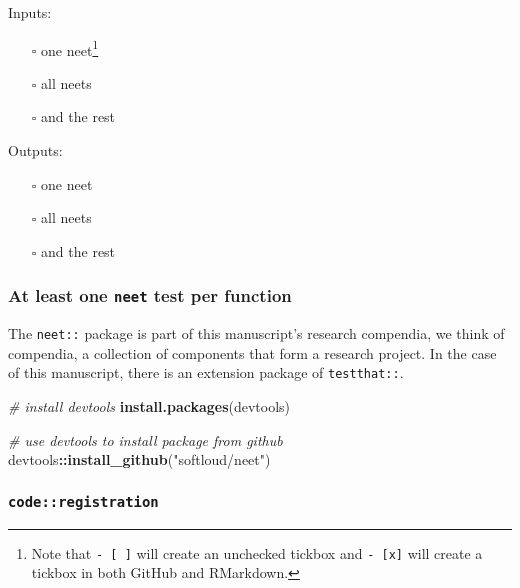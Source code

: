\documentclass[
]{article}
\newenvironment{Shaded}{\begin{snugshade}}{\end{snugshade}}
\newcommand{\CommentTok}[1]{\textcolor[rgb]{0.56,0.35,0.01}{\textit{#1}}}
\newcommand{\KeywordTok}[1]{\textcolor[rgb]{0.13,0.29,0.53}{\textbf{#1}}}
\newcommand{\NormalTok}[1]{#1}
\newcommand{\OperatorTok}[1]{\textcolor[rgb]{0.81,0.36,0.00}{\textbf{#1}}}
\newcommand{\StringTok}[1]{\textcolor[rgb]{0.31,0.60,0.02}{#1}}
\providecommand{\tightlist}{%
  \setlength{\itemsep}{0pt}\setlength{\parskip}{0pt}}
\begin{document}
Inputs:

\begin{itemize}
\tightlist
\item[$\square$]
  one neet\footnote{Note that \texttt{-\ {[}\ {]}} will create an
    unchecked tickbox and \texttt{-\ {[}x{]}} will create a tickbox in
    both GitHub and RMarkdown.}
\item[$\square$]
  all neets
\item[$\square$]
  and the rest
\end{itemize}

Outputs:

\begin{itemize}
\tightlist
\item[$\square$]
  one neet
\item[$\square$]
  all neets
\item[$\square$]
  and the rest
\end{itemize}

\hypertarget{at-least-one-neet-test-per-function}{%
\subsubsection{\texorpdfstring{At least one \texttt{neet} test per
function}{At least one neet test per function}}\label{at-least-one-neet-test-per-function}}

The \texttt{neet::} package is part of this manuscript's research
compendia, we think of compendia, a collection of components that form a
research project. In the case of this manuscript, there is an extension
package of \texttt{testthat::}.

\begin{Shaded}
\begin{Highlighting}[]
\CommentTok{\# install devtools}
\KeywordTok{install.packages}\NormalTok{(devtools) }

\CommentTok{\# use devtools to install package from github}
\NormalTok{devtools}\OperatorTok{::}\KeywordTok{install\_github}\NormalTok{(}\StringTok{"softloud/neet"}\NormalTok{)}
\end{Highlighting}
\end{Shaded}

\hypertarget{coderegistration-2}{%
\subsubsection{\texorpdfstring{\texttt{code::registration}}{code::registration}}\label{coderegistration-2}}
\end{document}
